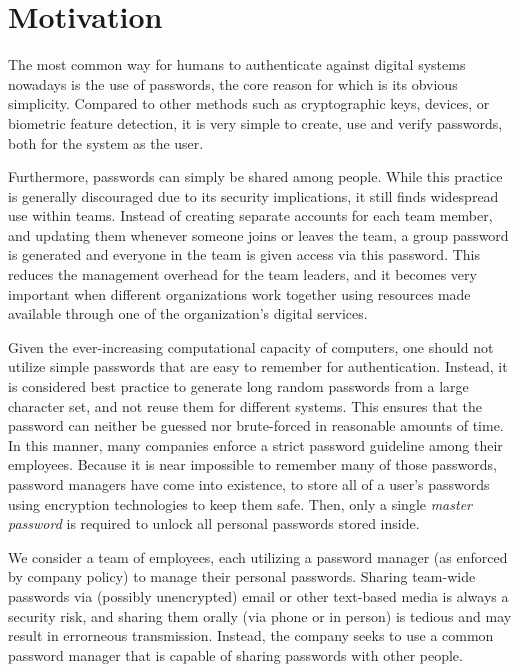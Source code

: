 \section{Motivation}


The most common way for humans to authenticate against digital systems nowadays is the use of passwords, the core reason for which is its obvious simplicity. Compared to other methods such as cryptographic keys, devices, or biometric feature detection, it is very simple to create, use and verify passwords, both for the system as the user.

Furthermore, passwords can simply be shared among people. While this practice is generally discouraged due to its security implications, it still finds widespread use within teams. Instead of creating separate accounts for each team member, and updating them whenever someone joins or leaves the team, a group password is generated and everyone in the team is given access via this password. This reduces the management overhead for the team leaders, and it becomes very important when different organizations work together using resources made available through one of the organization's digital services.



Given the ever-increasing computational capacity of computers, one should not utilize simple passwords that are easy to remember for authentication. Instead, it is considered best practice to generate long random passwords from a large character set, and not reuse them for different systems. This ensures that the password can neither be guessed nor brute-forced in reasonable amounts of time. In this manner, many companies enforce a strict password guideline among their employees. Because it is near impossible to remember many of those passwords, password managers have come into existence, to store all of a user's passwords using encryption technologies to keep them safe. Then, only a single \emph{master password} is required to unlock all personal passwords stored inside.

We consider a team of employees, each utilizing a password manager (as enforced by company policy) to manage their personal passwords. Sharing team-wide passwords via (possibly unencrypted) email or other text-based media is always a security risk, and sharing them orally (via phone or in person) is tedious and may result in errorneous transmission. Instead, the company seeks to use a common password manager that is capable of sharing passwords with other people.

